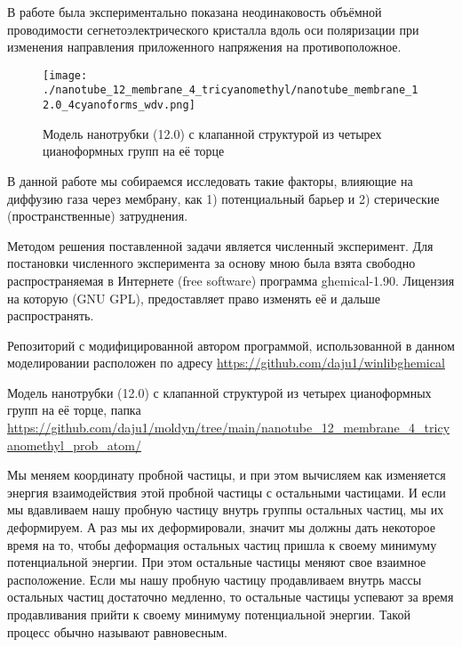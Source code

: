 \documentclass[12pt]{article}
\begin{document}

В работе \cite{KanaevMalinovsky1982} была экспериментально показана неодинаковость объёмной проводимости сегнетоэлектрического кристалла вдоль оси поляризации при изменения направления приложенного напряжения на противоположное.

\begin{wrapfigure}{l}{0.6\textwidth}
    \centering
    \texttt{[image: ./nanotube\_12\_membrane\_4\_tricyanomethyl/nanotube\_membrane\_12.0\_4cyanoforms\_wdv.png]}
    \caption{Модель нанотрубки (12.0) с клапанной структурой из четырех цианоформных групп на её торце}
\end{wrapfigure}

В данной работе мы собираемся исследовать такие факторы, влияющие на диффузию газа через мембрану, как 1) потенциальный барьер и 2) стерические (пространственные) затруднения.

Методом решения поставленной задачи является численный эксперимент. Для постановки численного эксперимента за основу мною была взята свободно распространяемая в Интернете (free software) программа ghemical-1.90. Лицензия на которую (GNU GPL), предоставляет право изменять её и дальше распространять.

Репозиторий с модифицированной автором программой, использованной в данном моделировании расположен по адресу  \url{https://github.com/daju1/winlibghemical}

Модель нанотрубки (12.0) с клапанной структурой из четырех цианоформных групп на её торце, папка \url{https://github.com/daju1/moldyn/tree/main/nanotube_12_membrane_4_tricyanomethyl_prob_atom/}

Мы меняем координату пробной частицы, и при этом вычисляем как изменяется энергия взаимодействия этой пробной частицы с остальными частицами. И если мы вдавливаем нашу пробную частицу внутрь группы остальных частиц, мы их деформируем. А раз мы их деформировали, значит мы должны дать некоторое время на то, чтобы деформация остальных частиц пришла к своему минимуму потенциальной энергии. При этом остальные частицы меняют свое взаимное расположение. Если мы нашу пробную частицу продавливаем внутрь массы остальных частиц достаточно медленно, то остальные частицы успевают за время продавливания прийти к своему минимуму потенциальной энергии. Такой процесс обычно называют равновесным.
\end{document}
